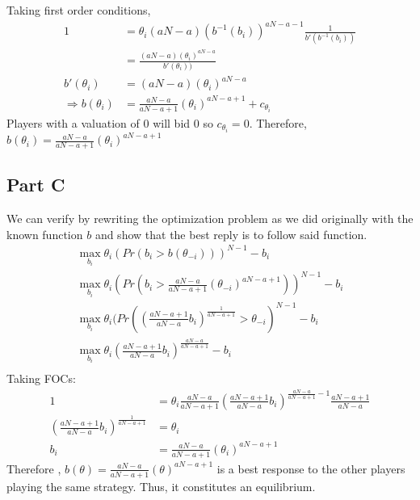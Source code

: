 \documentclass[11pt]{article} %
\begin{document}
Taking first order conditions,
\begin{align*}
1 &= \theta_i(aN-a) (b^{-1}(b_i))^{aN-a-1}\frac{1}{b'(b^{-1}(b_i))}\\
&= \frac{ (aN-a) (\theta_i)^{aN-a}}{b'(\theta_i))}\\
b'(\theta_i) &= (aN-a) (\theta_i)^{aN-a}\\
\Rightarrow b(\theta_i) &= \frac{aN-a}{aN-a+1}(\theta_i)^{aN-a+1} + c_{\theta_i}
\end{align*}
Players with a valuation of $0$ will bid $0$ so $c_{\theta_i}=0$. Therefore, $ b(\theta_i) = \frac{aN-a}{aN-a+1}(\theta_i)^{aN-a+1}$
\subsection{Part C}
We can verify by rewriting the optimization problem as we did originally with the known function $b$ and show that the best reply is to follow said function.
\begin{align*}
\max_{b_i} \theta_i (Pr(b_i > b(\theta_{-i})))^{N-1} - b_i\\
\max_{b_i} \theta_i (Pr(b_i >  \frac{aN-a}{aN-a+1}(\theta_{-i})^{aN-a+1}))^{N-1} - b_i\\
\max_{b_i} \theta_i (Pr(\left(\frac{aN-a+1}{aN-a}b_i\right)^{\frac{1}{aN-a+1}} > \theta_{-i})^{N-1} - b_i\\
\max_{b_i} \theta_i \left(\frac{aN-a+1}{aN-a}b_i\right)^{\frac{aN-a}{aN-a+1}}  - b_i\\
\end{align*}
Taking FOCs:
\begin{align*}
1 &= \theta_i \frac{aN-a}{aN-a+1} \left(\frac{aN-a+1}{aN-a}b_i\right)^{\frac{aN-a}{aN-a+1} - 1}\frac{aN-a+1}{aN-a}\\
\left(\frac{aN-a+1}{aN-a}b_i\right)^{\frac{1}{aN-a+1}} &= \theta_i \\
b_i &=  \frac{aN-a}{aN-a+1}(\theta_i)^{aN-a+1} 
\end{align*}
Therefore , $b(\theta) =  \frac{aN-a}{aN-a+1}(\theta)^{aN-a+1}$ is a best response to the other players playing the same strategy. Thus, it constitutes an equilibrium.
\end{document}
